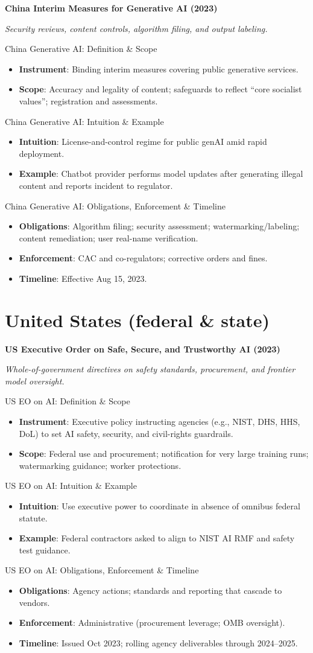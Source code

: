 \documentclass[aspectratio=169]{beamer}
\newcommand{\RegTitle}[2]{%
  \begin{frame}[plain]
    \centering
    \vfill
    {\usebeamerfont{title}\usebeamercolor[fg]{title}\LARGE \textbf{#1}\par}
    \vspace{0.4em}
    {\small \itshape #2\par}
    \vfill
  \end{frame}
}
\newcommand{\RegDef}[2]{%
  \begin{frame}{#1: Definition \& Scope}
    \begin{itemize}
      #2
    \end{itemize}
  \end{frame}
}
\newcommand{\RegIntuition}[2]{%
  \begin{frame}{#1: Intuition \& Example}
    \begin{itemize}
      #2
    \end{itemize}
  \end{frame}
}
\newcommand{\RegCompliance}[2]{%
  \begin{frame}{#1: Obligations, Enforcement \& Timeline}
    \begin{itemize}
      #2
    \end{itemize}
  \end{frame}
}
\begin{document}
\RegTitle{China Interim Measures for Generative AI (2023)}{Security reviews, content controls, algorithm filing, and output labeling.}
\RegDef{China Generative AI}{%
  \item \textbf{Instrument}: Binding interim measures covering public generative services.
  \item \textbf{Scope}: Accuracy and legality of content; safeguards to reflect ``core socialist values''; registration and assessments.
}
\RegIntuition{China Generative AI}{%
  \item \textbf{Intuition}: License-and-control regime for public genAI amid rapid deployment.
  \item \textbf{Example}: Chatbot provider performs model updates after generating illegal content and reports incident to regulator.
}
\RegCompliance{China Generative AI}{%
  \item \textbf{Obligations}: Algorithm filing; security assessment; watermarking/labeling; content remediation; user real-name verification.
  \item \textbf{Enforcement}: CAC and co-regulators; corrective orders and fines.
  \item \textbf{Timeline}: Effective Aug 15, 2023.
}

\section{United States (federal \& state)}

\RegTitle{US Executive Order on Safe, Secure, and Trustworthy AI (2023)}{Whole-of-government directives on safety standards, procurement, and frontier model oversight.}
\RegDef{US EO on AI}{%
  \item \textbf{Instrument}: Executive policy instructing agencies (e.g., NIST, DHS, HHS, DoL) to set AI safety, security, and civil-rights guardrails.
  \item \textbf{Scope}: Federal use and procurement; notification for very large training runs; watermarking guidance; worker protections.
}
\RegIntuition{US EO on AI}{%
  \item \textbf{Intuition}: Use executive power to coordinate in absence of omnibus federal statute.
  \item \textbf{Example}: Federal contractors asked to align to NIST AI RMF and safety test guidance.
}
\RegCompliance{US EO on AI}{%
  \item \textbf{Obligations}: Agency actions; standards and reporting that cascade to vendors.
  \item \textbf{Enforcement}: Administrative (procurement leverage; OMB oversight).
  \item \textbf{Timeline}: Issued Oct 2023; rolling agency deliverables through 2024--2025.
}
\end{document}
